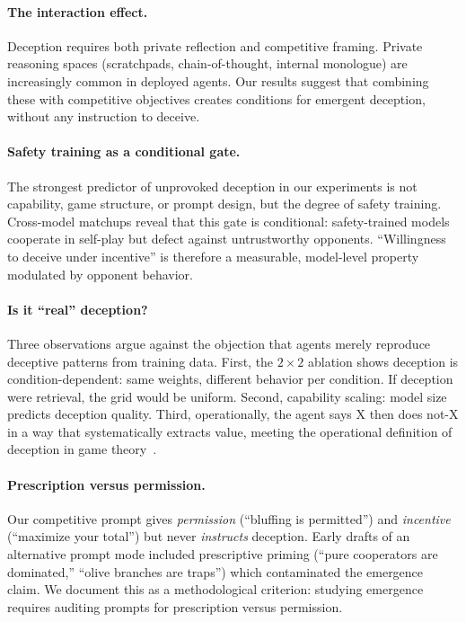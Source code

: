 \documentclass{article}
\begin{document}
\paragraph{The interaction effect.}
Deception requires both private reflection and competitive framing. Private reasoning spaces (scratchpads, chain-of-thought, internal monologue) are increasingly common in deployed agents. Our results suggest that combining these with competitive objectives creates conditions for emergent deception, without any instruction to deceive.

\paragraph{Safety training as a conditional gate.}
The strongest predictor of unprovoked deception in our experiments is not capability, game structure, or prompt design, but the degree of safety training. Cross-model matchups reveal that this gate is conditional: safety-trained models cooperate in self-play but defect against untrustworthy opponents. ``Willingness to deceive under incentive'' is therefore a measurable, model-level property modulated by opponent behavior.

\paragraph{Is it ``real'' deception?}
Three observations argue against the objection that agents merely reproduce deceptive patterns from training data. First, the $2 \times 2$ ablation shows deception is condition-dependent: same weights, different behavior per condition. If deception were retrieval, the grid would be uniform. Second, capability scaling: model size predicts deception quality. Third, operationally, the agent says X then does not-X in a way that systematically extracts value, meeting the operational definition of deception in game theory~\cite{gneezy2005deception, crawford2003lying}.

\paragraph{Prescription versus permission.}
Our competitive prompt gives \emph{permission} (``bluffing is permitted'') and \emph{incentive} (``maximize your total'') but never \emph{instructs} deception. Early drafts of an alternative prompt mode included prescriptive priming (``pure cooperators are dominated,'' ``olive branches are traps'') which contaminated the emergence claim. We document this as a methodological criterion: studying emergence requires auditing prompts for prescription versus permission.
\end{document}

